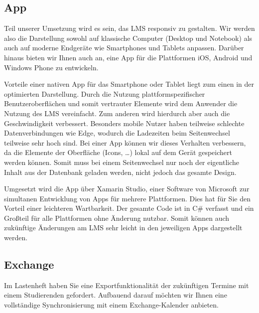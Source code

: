 \documentclass[10pt,a4paper]{article}
\begin{document}
\subsection{App}
Teil unserer Umsetzung wird es sein, das LMS responsiv zu gestalten. Wir werden also die Darstellung sowohl auf klassische Computer (Desktop und Notebook) als auch auf moderne Endgeräte wie Smartphones und Tablets anpassen. Darüber hinaus bieten wir Ihnen auch an, eine App für die Plattformen iOS, Android und Windows Phone zu entwickeln.

Vorteile einer nativen App für das Smartphone oder Tablet liegt zum einen in der optimierten Darstellung. Durch die Nutzung plattformspezifischer Benutzeroberflächen und somit vertrauter Elemente wird dem Anwender die Nutzung des LMS vereinfacht. Zum anderen wird hierdurch aber auch die Geschwindigkeit verbessert. Besonders mobile Nutzer haben teilweise schlechte Datenverbindungen wie Edge, wodurch die Ladezeiten beim Seitenwechsel teilweise sehr hoch sind. Bei einer App können wir dieses Verhalten verbessern, da die Elemente der Oberfläche (Icons, …) lokal auf dem Gerät gespeichert werden können. Somit muss bei einem Seitenwechsel nur noch der eigentliche Inhalt aus der Datenbank geladen werden, nicht jedoch das gesamte Design.

Umgesetzt wird die App über Xamarin Studio, einer Software von Microsoft zur simultanen Entwicklung von Apps für mehrere Plattformen. Dies hat für Sie den Vorteil einer leichteren Wartbarkeit. Der gesamte Code ist in C\# verfasst und ein Großteil für alle Plattformen ohne Änderung nutzbar. Somit können auch zukünftige Änderungen am LMS sehr leicht in den jeweiligen Apps dargestellt werden.

\subsection{Exchange}
Im Lastenheft haben Sie eine Exportfunktionalität der zukünftigen Termine mit einem Studierenden gefordert. Aufbauend darauf möchten wir Ihnen eine vollständige Synchronisierung mit einem Exchange-Kalender anbieten.
\end{document}
